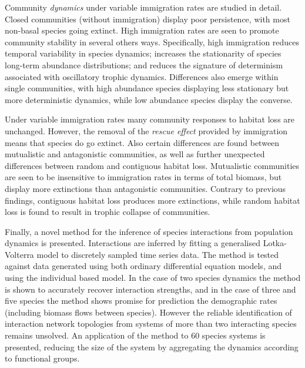 \begin{SingleSpace}
Community \emph{dynamics} under variable immigration rates are studied in detail. Closed communities (without immigration) display poor persistence, with most non-basal species going extinct. High immigration rates are seen to promote community stability in several others ways. Specifically, high immigration reduces temporal variability in species dynamics; increases the stationarity of species long-term abundance distributions; and reduces the signature of determinism associated with oscillatory trophic dynamics. Differences also emerge within single communities, with high abundance species displaying less stationary but more deterministic dynamics, while low abundance species display the converse. 

Under variable immigration rates many community responses to habitat loss are unchanged. However, the removal of the \emph{rescue effect} provided by immigration means that species do go extinct. Also certain differences are found between mutualistic and antagonistic communities, as well as further unexpected differences between random and contiguous habitat loss. Mutualistic communities are seen to be insensitive to immigration rates in terms of total biomass, but display more extinctions than antagonistic communities. Contrary to previous findings, contiguous habitat loss produces more extinctions, while random habitat loss is found to result in trophic collapse of communities. 

Finally, a novel method for the inference of species interactions from population dynamics is presented. Interactions are inferred by fitting a generalised Lotka-Volterra model to discretely sampled time series data. The method is tested against data generated using both ordinary differential equation models, and using the individual based model. In the case of two species dynamics the method is shown to accurately recover interaction strengths, and in the case of three and five species the method shows promise for prediction the demographic rates (including biomass flows between species). However the reliable identification of interaction network topologies from systems of more than two interacting species remains unsolved. An application of the method to 60 species systems is presented, reducing the size of the system by aggregating the dynamics according to functional groups.   

\end{SingleSpace}
\clearpage